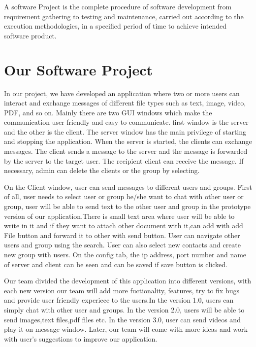     A software Project is the complete procedure of software development from requirement gathering to testing and
    maintenance, carried out according to the execution methodologies, in a specified period of time to achieve 
    intended software product.

   \section{Our Software  Project}
   In our project, we have developed an application where two or more users can interact and exchange messages 
   of different file types such as text, image, video, PDF, and so on. Mainly there are two GUI windows which make 
   the communication user friendly and easy to communicate. first window is the server and the other is the client. 
   The server window has the main privilege of starting and stopping the application. When the server is started,
    the clients can exchange messages. The client sends a message to the server and the message is forwarded 
    by the server to the target user. The recipient client can receive the message. If necessary, admin can delete 
    the clients or the group by selecting.
    \medskip
    
    \noindent
    On the Client window, user can send messages to different users and groups. First of all, user needs to select user
     or group he/she want to chat with other user or group, user will be able to send text to the other user and group
      in the prototype version of our application.There is small text area where 
user will be able to write in it and if they want to attach other document with it,can add with add File button and 
forward it to other with send button. User can navigate other users and group using the search. User can also 
select new contacts and create new group with users. On the config tab, the ip address, port number and name of 
server and client  can be seen and can be saved if save button is clicked.
   \medskip
   
   \noindent
   Our team divided the development of this application into different versions, with each new version 
   our team will add more fuctionality, features, try to fix bugs and provide user friendly experiece to 
   the users.In the version 1.0, users can simply chat with other user and groups. In the version 2.0, 
users will be able to send images,text files,pdf files etc. In the version 3.0, user can send videos
 and play it on message window. Later, our team will come with more ideas and work with user's 
 suggestions to improve our application.




\begin{comment}
Reference
https://en.wikipedia.org/wiki/Java_(programming_language)
https://www.oracle.com/java/
https://www.w3schools.com/java/
https://en.wikipedia.org/wiki/Thread_(computing)
https://en.wikibooks.org/wiki/Git
https://www.tutorialspoint.com/software_engineering/software_project_management.htm
\end{comment}
